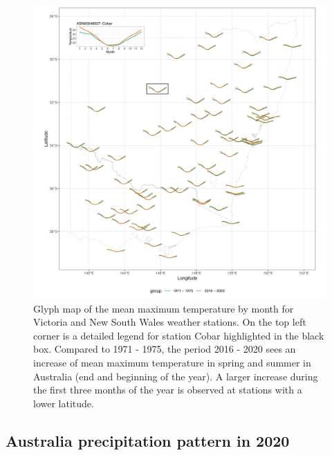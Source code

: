 \documentclass[
]{jss}
\begin{document}
\begin{CodeChunk}
\begin{figure}

{\centering \includegraphics[width=1\linewidth,height=0.7\textheight]{figures/basic-manip} 

}

\caption[Glyph map of the mean maximum temperature by month for Victoria and New South Wales weather stations]{Glyph map of the mean maximum temperature by month for Victoria and New South Wales weather stations. On the top left corner is a detailed legend for station Cobar highlighted in the black box. Compared to 1971 - 1975,  the period 2016 - 2020 sees an increase of mean maximum temperature in spring and summer in Australia (end and beginning of the year). A larger increase during the first three months of the year is observed at stations with a lower latitude.}\label{fig:basic-manip}
\end{figure}
\end{CodeChunk}

\hypertarget{australia-precipitation-pattern-in-2020}{%
\subsection{Australia precipitation pattern in
2020}\label{australia-precipitation-pattern-in-2020}}
\end{document}
